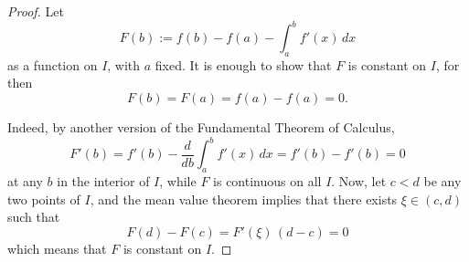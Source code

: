 

\begin{proof}

Let 
$$
F(b) := f(b) - f(a) - \int_a^b f'(x)\,dx 
$$
as a function on $I$, with $a$ fixed. It is enough to 
show that $F$ is constant on $I$, for then 
$$
F(b) = F(a) = f(a) - f(a) = 0.
$$

Indeed, by another version of the Fundamental Theorem of Calculus,
$$
F'(b) = f'(b) - \frac{d}{db}\int_a^b f'(x)\,dx = f'(b) - f'(b) = 0
$$
at any $b$ in the interior of $I$, while $F$ is continuous on all $I$. 
Now, let $c<d$ be any two points of $I$, and the mean value theorem 
implies that there exists $\xi\in (c,d)$ such that
$$
F(d) - F(c) = F'(\xi)\, (d-c) = 0
$$
which means that $F$ is constant on $I$.

\end{proof}

